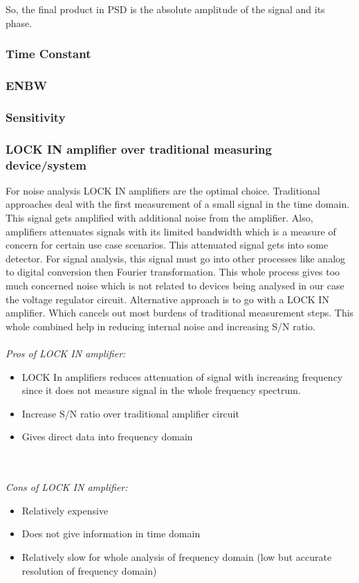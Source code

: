 \documentclass[12pt]{article}
\begin{document}
So, the final product in PSD is the absolute amplitude of the signal and its phase. 

\subsubsection{Time Constant }

\subsubsection{ENBW}

\subsubsection{Sensitivity} 

\subsubsection{LOCK IN amplifier over traditional measuring device/system}

For noise analysis LOCK IN amplifiers are the optimal choice. Traditional approaches deal with the first measurement of a small signal in the time domain. This signal gets amplified with additional noise from the amplifier. Also, amplifiers attenuates signals with its limited bandwidth which is a measure of concern for certain use case scenarios. This attenuated signal gets into some detector. For signal analysis, this signal must go into other  processes like analog to digital conversion then Fourier transformation. This whole process gives too much concerned noise which is not related to devices being analysed in our case the voltage regulator circuit. Alternative approach is to go with a LOCK IN amplifier. Which cancels out most burdens of traditional measurement steps. This whole combined help in reducing internal noise and increasing S/N ratio.
\\
\\
\emph{\large Pros of LOCK IN amplifier:}
\begin{itemize}
\item LOCK In amplifiers reduces attenuation of signal with increasing frequency since it does not measure signal in the whole frequency spectrum.
\item Increase S/N ratio over traditional amplifier circuit
\item Gives direct data into frequency domain
\end{itemize}\\
\\
\emph {\large Cons of LOCK IN amplifier:}
\begin{itemize}
\item Relatively expensive
\item Does not give information in time domain
\item Relatively slow for whole analysis of frequency domain (low but accurate resolution of frequency domain)
\end{itemize}
\end{document}
